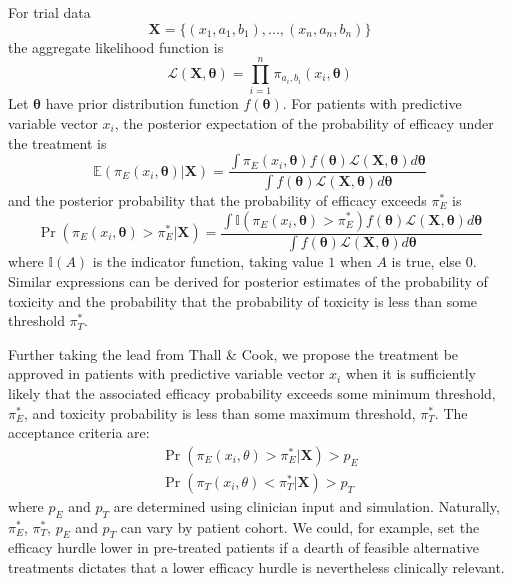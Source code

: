 \documentclass[alpha-refs]{wiley-article}
\begin{document}
For trial data
\begin{equation}
\boldsymbol{X} = \{(x_1, a_1, b_1), ..., (x_n, a_n, b_n) \}
\end{equation} 
the aggregate likelihood function is
\begin{equation}
\mathcal{L}(\boldsymbol{X}, \boldsymbol{\theta}) = \prod_{i=1}^n \pi_{a_i, b_i} (x_i, \boldsymbol{\theta})
\end{equation}
Let $\boldsymbol{\theta}$ have prior distribution function $f(\boldsymbol{\theta})$.
For patients with predictive variable vector $x_i$, the posterior expectation of the probability of efficacy under the treatment is 
\begin{equation}
\label{eqn:post.eff}
\mathbb{E}(\pi_E(x_i, \boldsymbol{\theta}) | \boldsymbol{X}) = \frac{\int \pi_E(x_i, \boldsymbol{\theta}) f(\boldsymbol{\theta})  \mathcal{L}(\boldsymbol{X}, \boldsymbol{\theta}) d\boldsymbol{\theta}}{\int f(\boldsymbol{\theta})  \mathcal{L}(\boldsymbol{X}, \boldsymbol{\theta}) d\boldsymbol{\theta}}
\end{equation}
and the posterior probability that the probability of efficacy exceeds $\pi_E^*$ is 
\begin{equation}
\label{eqn:post.acc.eff}
\Pr(\pi_E(x_i, \boldsymbol{\theta}) > \pi_E^*| \boldsymbol{X}) = \frac{\int \mathbb{I}(\pi_E(x_i, \boldsymbol{\theta}) > \pi_E^*) f(\boldsymbol{\theta})  \mathcal{L}(\boldsymbol{X}, \boldsymbol{\theta}) d\boldsymbol{\theta}}{\int f(\boldsymbol{\theta})  \mathcal{L}(\boldsymbol{X}, \boldsymbol{\theta}) d\boldsymbol{\theta}}
\end{equation}
where $\mathbb{I}(A)$ is the indicator function, taking value $1$ when $A$ is true, else 0.
Similar expressions can be derived for posterior estimates of the probability of toxicity and the probability that the probability of toxicity is less than some threshold $\pi_T^*$.

Further taking the lead from Thall \& Cook, we propose the treatment be approved in patients with predictive variable vector $x_i$ when it is sufficiently likely that the associated efficacy probability exceeds some minimum threshold, $\pi_E^*$, and toxicity probability is less than some maximum threshold, $\pi_T^*$.
The acceptance criteria are:
\begin{equation}
\label{eqn:acceptance}
\begin{split}
\Pr(\pi_E(x_i, \theta) > \pi_E^* | \boldsymbol{X}) > p_E \\
\Pr(\pi_T(x_i, \theta) < \pi_T^* | \boldsymbol{X}) > p_T
\end{split}
\end{equation}
where $p_E$ and $p_T$ are determined using clinician input and simulation.
Naturally, $\pi_E^*$, $\pi_T^*$, $p_E$ and $p_T$ can vary by patient cohort.
We could, for example, set the efficacy hurdle lower in pre-treated patients if a dearth of feasible alternative treatments dictates that a lower efficacy hurdle is nevertheless clinically relevant.
\end{document}
